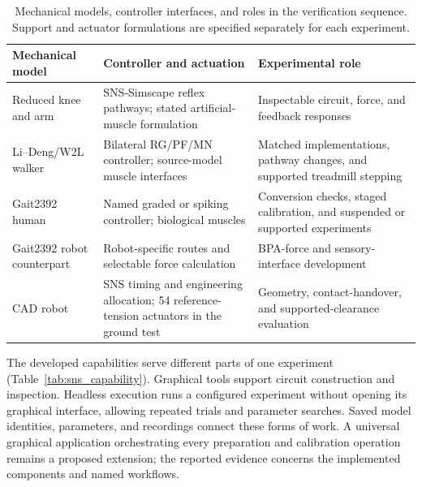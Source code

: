 \begin{table}[htbp]
\centering\small
\caption[Experimental models and their roles]{Mechanical models, controller interfaces, and roles in the verification sequence. Support and actuator formulations are specified separately for each experiment.}
\label{tab:sns_model_configurations}
\begin{tabularx}{\textwidth}{@{}>{\raggedright\arraybackslash}p{}>{\raggedright\arraybackslash}p{}>{\raggedright\arraybackslash}X@{}}
\toprule
Mechanical model & Controller and actuation & Experimental role \\
\midrule
Reduced knee and arm & SNS-Simscape reflex pathways; stated artificial-muscle formulation & Inspectable circuit, force, and feedback responses \\
Li--Deng/W2L walker & Bilateral RG/PF/MN controller; source-model muscle interfaces & Matched implementations, pathway changes, and supported treadmill stepping \\
Gait2392 human & Named graded or spiking controller; biological muscles & Conversion checks, staged calibration, and suspended or supported experiments \\
Gait2392 robot counterpart & Robot-specific routes and selectable force calculation & BPA-force and sensory-interface development \\
CAD robot & SNS timing and engineering allocation; 54 reference-tension actuators in the ground test & Geometry, contact-handover, and supported-clearance evaluation \\
\bottomrule
\end{tabularx}
\end{table}

The developed capabilities serve different parts of one experiment (Table~\ref{tab:sns_capability}). Graphical tools support circuit construction and inspection. Headless execution runs a configured experiment without opening its graphical interface, allowing repeated trials and parameter searches. Saved model identities, parameters, and recordings connect these forms of work. A universal graphical application orchestrating every preparation and calibration operation remains a proposed extension; the reported evidence concerns the implemented components and named workflows.

